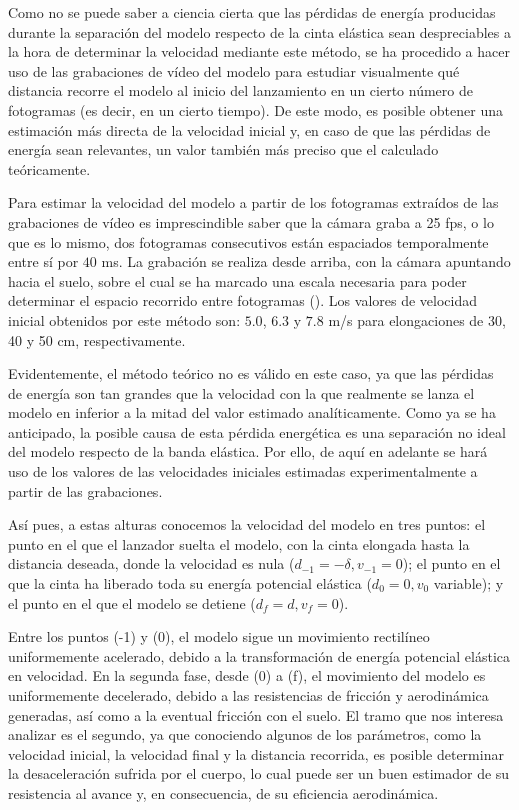 Como no se puede saber a ciencia cierta que las pérdidas de energía producidas durante la separación del modelo respecto de la cinta elástica sean despreciables a la hora de determinar la velocidad mediante este método, se ha procedido a hacer uso de las grabaciones de vídeo del modelo para estudiar visualmente qué distancia recorre el modelo al inicio del lanzamiento en un cierto número de fotogramas (es decir, en un cierto tiempo). De este modo, es posible obtener una estimación más directa de la velocidad inicial y, en caso de que las pérdidas de energía sean relevantes, un valor también más preciso que el calculado teóricamente.

Para estimar la velocidad del modelo a partir de los fotogramas extraídos de las grabaciones de vídeo es imprescindible saber que la cámara graba a 25 fps, o lo que es lo mismo, dos fotogramas consecutivos están espaciados temporalmente entre sí por $40$ ms. La grabación se realiza desde arriba, con la cámara apuntando hacia el suelo, sobre el cual se ha marcado una escala necesaria para poder determinar el espacio recorrido entre fotogramas (). Los valores de velocidad inicial obtenidos por este método son: $5.0$, $6.3$ y $7.8$ m/s para elongaciones de 30, 40 y 50 cm, respectivamente.


Evidentemente, el método teórico no es válido en este caso, ya que las pérdidas de energía son tan grandes que la velocidad con la que realmente se lanza el modelo en inferior a la mitad del valor estimado analíticamente. Como ya se ha anticipado, la posible causa de esta pérdida energética es una separación no ideal del modelo respecto de la banda elástica. Por ello, de aquí en adelante se hará uso de los valores de las velocidades iniciales estimadas experimentalmente a partir de las grabaciones.

Así pues, a estas alturas conocemos la velocidad del modelo en tres puntos: el punto en el que el lanzador suelta el modelo, con la cinta elongada hasta la distancia deseada, donde la velocidad es nula ($d_{-1}=-\delta, v_{-1}=0$); el punto en el que la cinta ha liberado toda su energía potencial elástica ($d_0=0, v_0$ variable); y el punto en el que el modelo se detiene ($d_f=d, v_f=0$).

Entre los puntos (-1) y (0), el modelo sigue un movimiento rectilíneo uniformemente acelerado, debido a la transformación de energía potencial elástica en velocidad. En la segunda fase, desde (0) a (f), el movimiento del modelo es uniformemente decelerado, debido a las resistencias de fricción y aerodinámica generadas, así como a la eventual fricción con el suelo. El tramo que nos interesa analizar es el segundo, ya que conociendo algunos de los parámetros, como la velocidad inicial, la velocidad final y la distancia recorrida, es posible determinar la desaceleración sufrida por el cuerpo, lo cual puede ser un buen estimador de su resistencia al avance y, en consecuencia, de su eficiencia aerodinámica.

